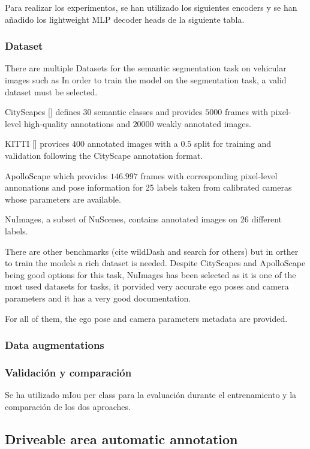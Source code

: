 Para realizar los experimentos, se han utilizado los siguientes encoders y se han añadido los lightweight MLP decoder heads de la siguiente tabla. 

\subsubsection{Dataset}
There are multiple Datasets for the semantic segmentation task on vehicular images such as 
In order to train the model on the segmentation task, a valid dataset must be selected. 

CityScapes [] defines $30$ semantic classes and provides $5000$ frames with pixel-level high-quality annotations and $20000$ weakly annotated images. 

KITTI [] provices $400$ annotated images with a $0.5$ split for training and validation following the CityScape annotation format. 

ApolloScape \cite{ApolloScape} which provides $146.997$ frames with corresponding pixel-level annonations and pose information for 25 labels taken from calibrated cameras whose parameters are available.

NuImages, a subset of NuScenes, contains annotated images on 26 different labels.

There are other benchmarks (cite wildDash and search for others) but in orther to train the models a rich dataset is needed. Despite CityScapes and ApolloScape being good options for this task, NuImages has been selected as it is one of the most used datasets for  tasks, it porvided very accurate ego poses and camera parameters and it has a very good documentation.


For all of them, the ego pose and camera parameters metadata are provided. 


\subsubsection{Data augmentations}
\subsubsection{Validación y comparación}
Se ha utilizado mIou per class para la evaluación durante el entrenamiento y la comparación de los dos aproaches.


\subsection{ Driveable area automatic annotation}
\label{aplicacion}

